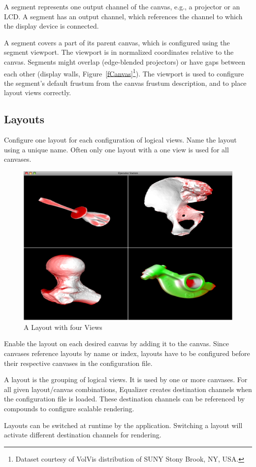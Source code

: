 \documentclass[10pt,a4]{scrartcl}
\newcommand{\fig}[1]{Figure~\ref{#1}}
\begin{document}
A segment represents one output channel of the canvas, e.g., a projector
or an LCD. A segment has an output channel, which references the channel to
which the display device is connected.

A segment covers a part of its parent canvas, which is configured using the
segment viewport. The viewport is in normalized coordinates relative to the
canvas. Segments might overlap (edge-blended projectors) or have gaps between
each other (display walls, \fig{fCanvas}\footnote{Dataset courtesy of VolVis
  distribution of SUNY Stony Brook, NY, USA.}). The viewport is used to
configure the segment's default frustum from the canvas frustum description, and
to place layout views correctly.

\subsection{\label{sLayout}Layouts}

Configure one \textsf{layout} for each configuration of logical
views. Name the layout using a unique name. Often only one layout with a
one view is used for all canvases.

\begin{figure}
  \includegraphics[width=.382\textwidth]{images/layout.png}
  {\caption{\label{fLayout}A Layout with four Views}}
\end{figure}
Enable the layout on each desired canvas by adding it to the
canvas. Since canvases reference layouts by name or index, layouts have
to be configured before their respective canvases in the configuration
file.

A layout is the grouping of logical views. It is used by one or more
canvases. For all given layout/canvas combinations, Equalizer creates
destination channels when the configuration file is loaded. These
destination channels can be referenced by compounds to configure
scalable rendering.

Layouts can be switched at runtime by the application. Switching a
layout will activate different destination channels for rendering.
\end{document}
